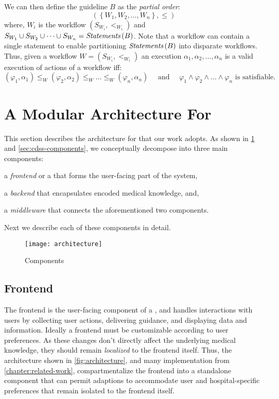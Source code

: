 We can then define the guideline $B$ as the \emph{partial order}:
\[
  \left(\left\{W_1,W_2,\dots,W_n\right\}, \leq\right)
\]
where, $W_i$ is the workflow $\left(S_{W_i}, <_{W_i}\right)$ and
$S_{W_1} \cup S_{W_2} \cup \dots \cup S_{W_n} = \textit{Statements}\left(B\right)$. Note that a
workflow can contain a single statement to enable partitioning $\textit{Statements}\left(B\right)$
into disparate workflows. Thus, given a workflow $W =\left(S_{W_i},
    <_{W_i}\right)$  an execution
$\alpha_1,\alpha_2,\dots,\alpha_n$ is a valid execution of actions of a workflow
iff:
\[
  \left(\varphi_1,\alpha_1\right) \leq_W \left(\varphi_2,\alpha_2\right) \leq_W \dots \leq_W \left(\varphi_n,\alpha_n\right)
  \quad\text{ and }\quad
  \varphi_1 \wedge \varphi_2 \wedge \dots \wedge \varphi_n \text{ is satisfiable.}
\]

\section{A Modular Architecture For \CDSSs{}}
This section describes the architecture for \CDSSs{}
that our work adopts. As shown in \figurename{} \ref{fig:architecture}
and \autoref{sec:cdss-components}, we conceptually
decompose \CDSSs{} into three main components:
\begin{enumerate*}[label=(\roman*)]
    \item a \emph{frontend} or a \UI{} that forms the user-facing part of the system,
    \item a \emph{backend} that encapsulates encoded medical knowledge, and,
    \item a \emph{middleware} that connects the aforementioned two components.
\end{enumerate*}
Next we describe each of these components in detail.

\begin{figure}[t]
\centering
\texttt{[image: architecture]}
\caption{\CDSSs{} Components}\label{fig:architecture}
\end{figure}


\subsection{Frontend}\label{sec:frontend}

The frontend is the user-facing component of a \CDSS{}, and
handles interactions with users by collecting user actions,
delivering guidance, and displaying data and information.
Ideally a \CDSS{} frontend must be customizable according to
user preferences. As these changes don't directly
affect the underlying medical knowledge, they should remain
\emph{localized} to the frontend itself.
Thus, the architecture shown in \autoref{fig:architecture},
and many implementation from \autoref{chapter:related-work},
compartmentalize the frontend into a standalone component that
can permit adaptions to accommodate user and hospital-specific
preferences that remain isolated to the frontend itself.

